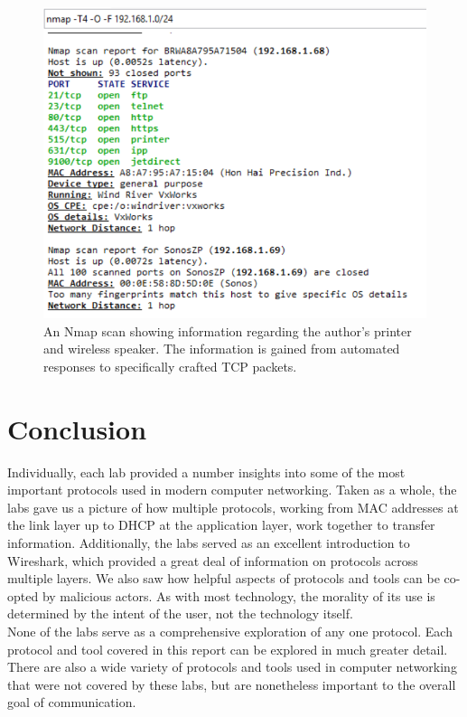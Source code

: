 \documentclass[10pt]{IEEEtran}
\begin{document}
    \begin{figure}[h!]
	\includegraphics[width=\linewidth]{nmapscan.png}
	\caption{An Nmap scan showing information regarding the author's printer and wireless speaker. The information is gained from automated responses to specifically crafted TCP packets.}
	\label{fig:nmapscan}
\end{figure}
 
\section{Conclusion}

 Individually, each lab provided a number insights into some of the most important protocols used in modern computer networking. Taken as a whole, the labs gave us a picture of how multiple protocols, working from MAC addresses at the link layer up to DHCP at the application layer, work together to transfer information. Additionally, the labs served as an excellent introduction to Wireshark, which provided a great deal of information on protocols across multiple layers. We also saw how helpful aspects of protocols and tools can be co-opted by malicious actors. As with most technology, the morality of its use is determined by the intent of the user, not the technology itself.\\
 
 None of the labs serve as a comprehensive exploration of any one protocol. Each protocol and tool covered in this report can be explored in much greater detail. There are also a wide variety of protocols and tools used in computer networking that were not covered by these labs, but are nonetheless important to the overall goal of communication.
 
\end{document}
